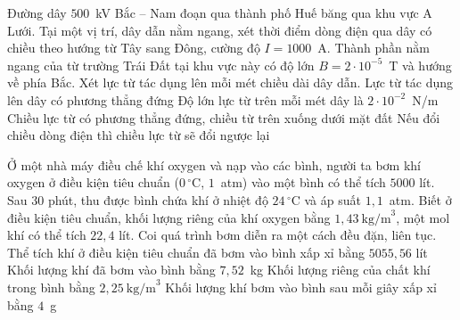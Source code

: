 	\begin{ex}%
		Đường dây $500$~kV Bắc -- Nam đoạn qua thành phố Huế băng qua khu vực A Lưới. Tại một vị trí, dây dẫn nằm ngang, xét thời điểm dòng điện qua dây có chiều theo hướng từ Tây sang Đông, cường độ $I=1000$~A. Thành phần nằm ngang của từ trường Trái Đất tại khu vực này có độ lớn $B=2\cdot 10^{-5}$~T và hướng về phía Bắc. Xét lực từ tác dụng lên mỗi mét chiều dài dây dẫn.
		\choiceTFt
		{\True Lực từ tác dụng lên dây có phương thẳng đứng}
		{\True Độ lớn lực từ trên mỗi mét dây là $2\cdot 10^{-2}$~N/m}
		{Chiều lực từ có phương thẳng đứng, chiều từ trên xuống dưới mặt đất}
		{\True Nếu đổi chiều dòng điện thì chiều lực từ sẽ đổi ngược lại}
	\end{ex}

	\begin{ex}%
		Ở một nhà máy điều chế khí oxygen và nạp vào các bình, người ta bơm khí oxygen ở điều kiện tiêu chuẩn ($0\,^\circ\text{C}$, $1$~atm) vào một bình có thể tích $5000$ lít. Sau $30$ phút, thu được bình chứa khí ở nhiệt độ $24\,^\circ\text{C}$ và áp suất $1{,}1$~atm. Biết ở điều kiện tiêu chuẩn, khối lượng riêng của khí oxygen bằng $1{,}43~\text{kg/m}^3$, một mol khí có thể tích $22{,}4$ lít. Coi quá trình bơm diễn ra một cách đều đặn, liên tục.
		\choiceTFt
		{\True Thể tích khí ở điều kiện tiêu chuẩn đã bơm vào bình xấp xỉ bằng $5055{,}56$ lít}
		{Khối lượng khí đã bơm vào bình bằng $7{,}52$~kg}
		{Khối lượng riêng của chất khí trong bình bằng $2{,}25~\text{kg/m}^3$}
		{\True Khối lượng khí bơm vào bình sau mỗi giây xấp xỉ bằng $4$~g}
	\end{ex}

